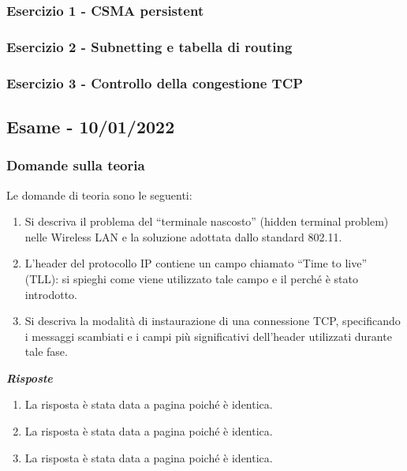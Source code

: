 \documentclass[a4paper]{article}
\newcommand{\dquotes}[1]{``#1''}
\begin{document}
	\subsubsection{Esercizio 1 - CSMA persistent}
	
	\subsubsection{Esercizio 2 - Subnetting e tabella di routing}
	
	\subsubsection{Esercizio 3 - Controllo della congestione TCP}
	
	\newpage

	\subsection[\textbf{Esame - 10/01/2022}]{Esame - 10/01/2022}
	
	\subsubsection{Domande sulla teoria}
	Le domande di teoria sono le seguenti:
	\begin{enumerate}
		\item Si descriva il problema del \dquotes{terminale nascosto} (hidden terminal problem) nelle Wireless LAN e la soluzione adottata dallo standard 802.11.
		
		\item L'header del protocollo IP contiene un campo chiamato \dquotes{Time to live} (TLL): si spieghi come viene utilizzato tale campo e il perché è stato introdotto.
		
		\item Si descriva la modalità di instaurazione di una connessione TCP, specificando i messaggi scambiati e i campi più significativi dell'header utilizzati durante tale fase.
	\end{enumerate}
	\textcolor{Green4}{\textbf{\emph{Risposte}}}
	\begin{enumerate}
		\item La risposta è stata data a pagina \pageref{hidden terminal problem} poiché è identica.
		
		\item La risposta è stata data a pagina \pageref{TTL} poiché è identica.
		
		\item La risposta è stata data a pagina \pageref{TCP instaurazione connessione} poiché è identica.
	\end{enumerate}
	
\end{document}
